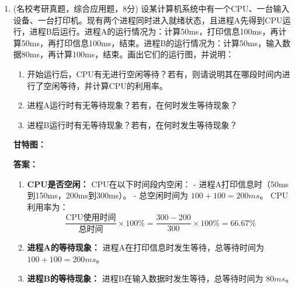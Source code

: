 \documentclass[lang=cn,newtx,10pt,scheme=chinese]{../../elegantbook}
\begin{document}
\begin{enumerate}
    \item (名校考研真题，综合应用题，8分) 设某计算机系统中有一个CPU、一台输入设备、一台打印机。现有两个进程同时进入就绪状态，且进程A先得到CPU运行，进程B后运行。进程A的运行情况为：计算50ms，打印信息100ms，再计算50ms，再打印信息100ms，结束。进程B的运行情况为：计算50ms，输入数据80ms，再计算100ms，结束。画出它们的运行图，并说明：

\begin{enumerate}
    \item 开始运行后，CPU有无进行空闲等待？若有，则请说明其在哪段时间内进行了空闲等待，并计算CPU的利用率。
    \item 进程A运行时有无等待现象？若有，在何时发生等待现象？
    \item 进程B运行时有无等待现象？若有，在何时发生等待现象？
\end{enumerate}

\textbf{甘特图：}

\begin{center}
    \end{center}
    

\textbf{答案：}

\begin{enumerate}
    \item \textbf{CPU是否空闲：}  
    CPU在以下时间段内空闲：  
    - 进程A打印信息时（50ms到150ms，200ms到300ms）。  
    - 总空闲时间为 \(100 + 100 = 200ms\)。  
    CPU利用率为：
    \[
    \frac{\text{CPU使用时间}}{\text{总时间}} \times 100\% = \frac{300 - 200}{300} \times 100\% = 66.67\%
    \]

    \item \textbf{进程A的等待现象：}  
    进程A在打印信息时发生等待，总等待时间为 \(100 + 100 = 200ms\)。  

    \item \textbf{进程B的等待现象：}  
    进程B在输入数据时发生等待，总等待时间为 \(80ms\)。  
\end{enumerate}
\end{enumerate}
\end{document}
